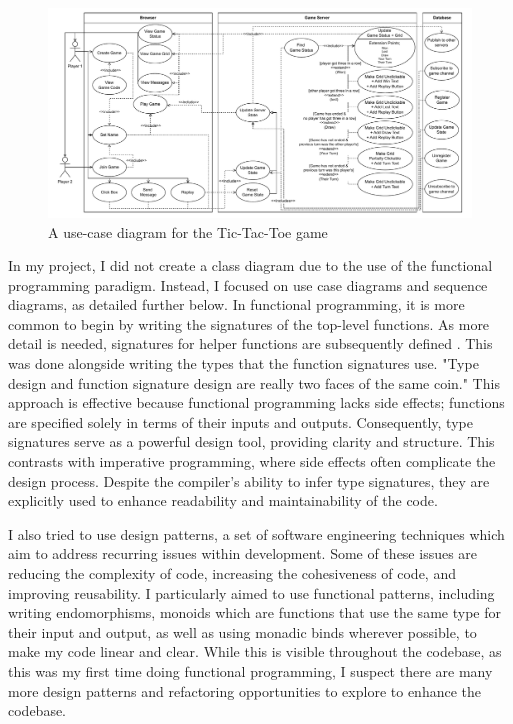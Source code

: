\documentclass[]{final}
\begin{document}
\begin{figure}[ht!]
  \centering
  \includegraphics[width=\linewidth]{use_case}
  \vspace*{-0.5cm}
  \caption{A use-case diagram for the Tic-Tac-Toe game}
  \label{fig: 2}
\end{figure}

In my project, I did not create a class diagram due to the use of the functional
programming paradigm. Instead, I focused on use case diagrams and sequence diagrams,
as detailed further below. In functional programming, it is more common to begin
by writing the signatures of the top-level functions. As more detail is needed,
signatures for helper functions are subsequently defined \cite{Wlaschin_functional_2014}.
This was done alongside writing the types that the function signatures use. "Type design and function
signature design are really two faces of the same coin."\cite{noauthor_chapter_2024}
This approach is effective because functional programming lacks side effects; functions are
specified solely in terms of their inputs and outputs. Consequently,
type signatures serve as a powerful design tool, providing clarity and structure.
This contrasts with imperative programming, where side effects often complicate
the design process. Despite the compiler's ability to infer type signatures,
they are explicitly used to enhance readability and maintainability of the code.

I also tried to use design patterns, a set of software engineering
techniques which aim to address recurring issues within development. Some of these
issues are reducing the complexity of code, increasing the cohesiveness of code,
and improving reusability. I particularly aimed to use functional patterns, including
writing endomorphisms, monoids which are functions that use the same type for their
input and output\cite{Wlaschin_functional_2014}, as well as using monadic binds
wherever possible, to make my code linear and clear. While this is visible
throughout the codebase, as this was my first time doing functional programming,
I suspect there are many more design patterns and refactoring opportunities to explore
to enhance the codebase.
\end{document}
